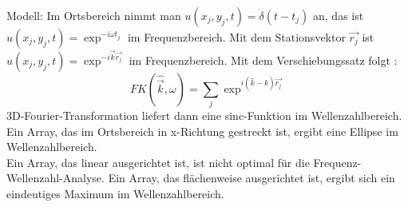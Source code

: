 Modell: Im Ortsbereich nimmt man $u(x_{j},y_{j},t) = \delta(t-t_{j})$ an, das ist $u(x_{j},y_{j},t)= \exp^{-i\omega t_{j}}$ im Frequenzbereich. Mit dem Stationsvektor $\vec{r_{j}}$ ist $u(x_{j},y_{j},t) = \exp^{-i\vec{k}\vec{r_{j}}}$  im Frequenzbereich.
Mit dem Verschiebungssatz folgt :
\begin{equation} FK(\hat{\vec{k}},\omega) = \sum_{j}\exp^{i( \hat{k}-k)\vec{r_{j}}}
\end{equation}
3D-Fourier-Transformation liefert dann eine sinc-Funktion im Wellenzahlbereich. Ein Array, das im Ortsbereich  in x-Richtung gestreckt ist, ergibt eine Ellipse im Wellenzahlbereich. \\
Ein Array, das linear ausgerichtet ist, ist nicht optimal für die Frequenz-Wellenzahl-Analyse. Ein Array, das flächenweise ausgerichtet ist, ergibt sich ein eindeutiges Maximum im Wellenzahlbereich.